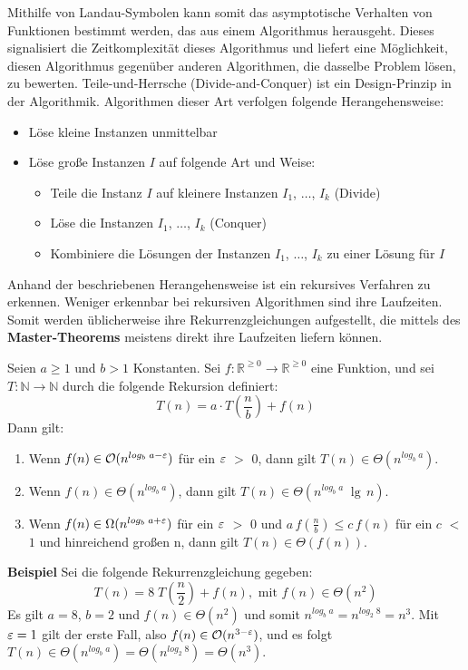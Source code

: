 Mithilfe von Landau-Symbolen kann somit das asymptotische Verhalten von Funktionen bestimmt werden, das aus einem Algorithmus herausgeht.
Dieses signalisiert die Zeitkomplexität dieses Algorithmus und liefert eine Möglichkeit, diesen Algorithmus gegenüber anderen Algorithmen, die dasselbe Problem lösen, zu bewerten.
\newpage
Teile-und-Herrsche (Divide-and-Conquer) ist ein Design-Prinzip in der Algorithmik.
Algorithmen dieser Art verfolgen folgende Herangehensweise:
\begin{itemize}
    \item Löse kleine Instanzen unmittelbar
    \item Löse große Instanzen $I$ auf folgende Art und Weise:
    \begin{itemize}
        \item Teile die Instanz $I$ auf kleinere Instanzen $I_{1}$, $\dots$, $I_{k}$ (Divide)
        \item Löse die Instanzen $I_{1}$, $\dots$, $I_{k}$ (Conquer)
        \item Kombiniere die Lösungen der Instanzen $I_{1}$, $\dots$, $I_{k}$ zu einer Lösung für $I$
    \end{itemize}
\end{itemize}
Anhand der beschriebenen Herangehensweise ist ein rekursives Verfahren zu erkennen.
Weniger erkennbar bei rekursiven Algorithmen sind ihre Laufzeiten.
Somit werden üblicherweise ihre Rekurrenzgleichungen aufgestellt, die mittels des \textbf{Master-Theorems} meistens direkt ihre Laufzeiten liefern können.
\begin{theorem}
    Seien $a \geq 1$ und $b > 1$ Konstanten.
    Sei $ f: \mathbb{R}^{\geq 0} \rightarrow \mathbb{R}^{\geq 0}$ eine Funktion, und sei $T : \mathbb{N} \rightarrow \mathbb{N}$ durch die folgende Rekursion definiert:
    \[
        T(n) = a \cdot T \left(\frac{n}{b}\right) + f(n)
    \]
    Dann gilt:
    \begin{enumerate}
        \item Wenn $f(n) \in \mathcal{O}(n^{log_b\;a-\varepsilon}) $ für ein $\varepsilon$ $>$ $0$, dann gilt $T(n) \in \Theta(n^{log_b\;a})$.
        \item Wenn $f(n) \in \Theta(n^{log_b\;a})$, dann gilt $T(n) \in \Theta(n^{log_b\;a}\;\lg\,n)$.
        \item Wenn $f(n) \in \Omega(n^{log_b\;a+\varepsilon}) $ für ein $\varepsilon$ $>$ $0$ und $a\,f\left(\frac{n}{b}\right) \leq c\,f(n)$ für ein $c$ $<$ $1$ und hinreichend großen n, dann gilt $T(n) \in \Theta(f(n))$.
    \end{enumerate}
\end{theorem}
\textbf{Beispiel} Sei die folgende Rekurrenzgleichung gegeben:
\begin{equation}
    T(n) =
    8\; T\left(\frac{n}{2}\right) + f(n),\text{ mit }f(n) \in \Theta(n^{2})\label{eq:equation}
\end{equation}
Es gilt $a = 8$, $b = 2$ und $f(n) \in \Theta(n^{2})$ und somit $n^{log_b\;a} = n^{log_2\;8} = n^3$.
Mit $\varepsilon = 1$ gilt der erste Fall, also $f(n) \in \mathcal{O}(n^{3-\varepsilon})$, und es folgt $T(n) \in \Theta(n^{log_b\;a}) = \Theta(n^{log_2\;8}) = \Theta(n^{3})$.